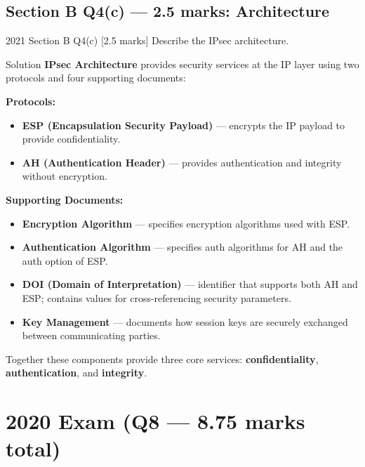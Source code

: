 \documentclass[12pt,a4paper]{article}
\begin{document}
\vspace{1em}

\subsection{Section B Q4(c) --- 2.5 marks: Architecture}

\begin{qbox}{2021 Section B Q4(c) [2.5 marks]}
  Describe the IPsec architecture.
\end{qbox}

\begin{solbox}{Solution}
\textbf{IPsec Architecture} provides security services at the IP layer using two protocols and four supporting documents:

\medskip
\textbf{Protocols:}
\begin{itemize}[nosep]
  \item \textbf{ESP (Encapsulation Security Payload)} --- encrypts the IP payload to provide confidentiality.
  \item \textbf{AH (Authentication Header)} --- provides authentication and integrity without encryption.
\end{itemize}

\medskip
\textbf{Supporting Documents:}
\begin{itemize}[nosep]
  \item \textbf{Encryption Algorithm} --- specifies encryption algorithms used with ESP.
  \item \textbf{Authentication Algorithm} --- specifies auth algorithms for AH and the auth option of ESP.
  \item \textbf{DOI (Domain of Interpretation)} --- identifier that supports both AH and ESP; contains values for cross-referencing security parameters.
  \item \textbf{Key Management} --- documents how session keys are securely exchanged between communicating parties.
\end{itemize}

\medskip
Together these components provide three core services: \textbf{confidentiality}, \textbf{authentication}, and \textbf{integrity}.
\end{solbox}

\vspace{1em}

\section{2020 Exam (Q8 --- 8.75 marks total)}
\end{document}
